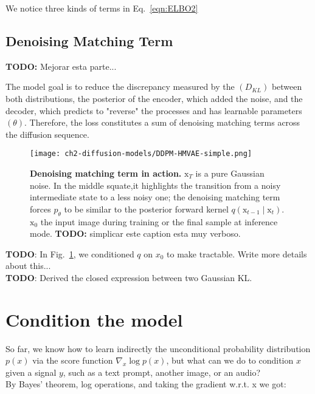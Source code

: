     We notice three kinds of terms in Eq.~\ref{eqn:ELBO2}

\subsection{Denoising Matching Term}

\textbf{TODO:} Mejorar esta parte...

The model goal is to reduce the discrepancy measured by the $(D_{KL})$ between both distributions, the posterior of the encoder, which added the noise, and the decoder, which predicts to "reverse" the processes and has learnable parameters $(\theta)$. Therefore, the loss constitutes a sum of denoising matching terms across the diffusion sequence.

\begin{figure}[ht]
  \centering
  \texttt{[image: ch2-diffusion-models/DDPM-HMVAE-simple.png]}
  \captionsetup{width=\textwidth} %
  \caption{\textbf{Denoising matching term in action.} $\mathrm{x}_{T}$ is a pure Gaussian noise. In the middle squate,it highlights the transition from a noisy intermediate state to a less noisy one; the denoising matching term forces $p_{\theta}$ to be similar to the posterior forward kernel $q(\mathrm{x}_{t-1}\mid \mathrm{x}_{t})$. $\mathrm{x}_{0}$ the input image during training or the final sample at inference mode. \textbf{TODO:} simplicar este caption esta muy verboso.}
  \label{fig:ddpm-denoising-term}
\end{figure}

\textbf{TODO}: In Fig.~\ref{fig:ddpm-denoising-term}, we conditioned $q$ on $x_{0}$ to make tractable. Write more details about this...\\

\textbf{TODO}: Derived the closed expression between two Gaussian KL.
    
\section{Condition the model}

So far, we know how to learn indirectly the unconditional probability distribution $p(x)$ via the score function $\nabla_{x}\log p(x)$, but what can we do to condition $x$ given a signal $y$, such as a text prompt, another image, or an audio?\\

By Bayes' theorem, log operations, and taking the gradient w.r.t. x we got:

